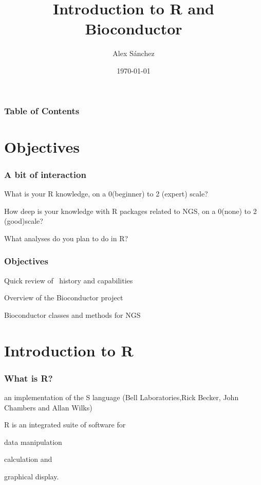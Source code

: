 \documentclass[xcolor=dvipsnames]{beamer}
\title{Introduction to R and Bioconductor}
\author{Alex S\'anchez}
\institute[UEB]{Unitat d'Estadística i Bioinformàtica (UEB)}
\date{\today}
\begin{document}
\begin{frame}[plain]
\titlepage
\end{frame}

\begin{frame}[Frame 1]
\addtocounter{framenumber}{-1}
\frametitle{Table of Contents}
\tableofcontents
\end{frame}


\section{Objectives}

  \begin{frame}
   \frametitle{A bit of interaction}
    
    \bit
      \item What is your R knowledge, on a 0(beginner) to 2 (expert) scale?
      \item How deep is your knowledge with R packages related 
	      			to NGS, on a 0(none) to 2 (good)scale?
      \item What analyses do you plan to do in R?
    \eit
\end{frame}

 \begin{frame}
\frametitle {Objectives}
\bit
\item Quick review of \R\, history and capabilities
\item Overview of the Bioconductor project
\item Bioconductor classes and methods for NGS
\eit
\end{frame}

\section{Introduction to R}
 \begin{frame}
  \frametitle{What is R?}
    \ben
    \item an implementation of the S language \tiny{(Bell Laboratories,Rick Becker, John Chambers and Allan Wilks)}
      \normalsize {
      \item R is an integrated suite of software for}
      		\bit
      			\item data manipulation
      			\item calculation and
      			\item graphical display.
      		\eit
    \een
  \end{frame}
\end{document}
